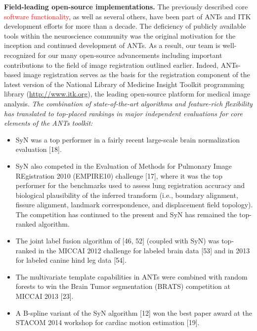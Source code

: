 \documentclass[11pt,]{article}
\providecommand{\tightlist}{%
  \setlength{\itemsep}{0pt}\setlength{\parskip}{0pt}}
\begin{document}
\textbf{Field-leading open-source implementations.} The previously
described core \textcolor{red}{software
functionality}, as well as several others, have been part of ANTs and
ITK development efforts for more than a decade. The deficiency of
publicly available tools within the neuroscience community was the
original motivation for the inception and continued development of ANTs.
As a result, our team is well-recognized for our many open-source
advancements including important contributions to the field of image
registration outlined earlier. Indeed, ANTs-based image registration
serves as the basis for the registration component of the latest version
of the National Library of Medicine Insight Toolkit programming library
(\url{http://www.itk.org}), the leading open-source platform for medical
image analysis. \emph{The combination of state-of-the-art algorithms and
feature-rich flexibility has translated to top-placed rankings in major
independent evaluations for core elements of the ANTs toolkit:}

\begin{itemize}
\tightlist
\item
  SyN was a top performer in a fairly recent large-scale brain
  normalization evaluation {[}18{]}.
\item
  SyN also competed in the Evaluation of Methods for Pulmonary Image
  REgistration 2010 (EMPIRE10) challenge {[}17{]}, where it was the top
  performer for the benchmarks used to assess lung registration accuracy
  and biological plausibility of the inferred transform (i.e., boundary
  alignment, fissure alignment, landmark correspondence, and
  displacement field topology). The competition has continued to the
  present and SyN has remained the top-ranked algorithm.
\item
  The joint label fusion algorithm of {[}46, 52{]} (coupled with SyN)
  was top-ranked in the MICCAI 2012 challenge for labeled brain data
  {[}53{]} and in 2013 for labeled canine hind leg data {[}54{]}.
\item
  The multivariate template capabilities in ANTs were combined with
  random forests to win the Brain Tumor segmentation (BRATS) competition
  at MICCAI 2013 {[}23{]}.
\item
  A B-spline variant of the SyN algorithm {[}12{]} won the best paper
  award at the STACOM 2014 workshop for cardiac motion estimation
  {[}19{]}.
\end{itemize}
\end{document}
